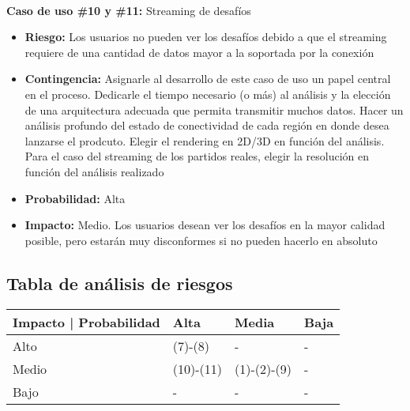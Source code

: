 ~

\textbf{Caso de uso \#10 y \#11:} Streaming de desafíos
\begin{itemize}
\item{\textbf{Riesgo:} Los usuarios no pueden ver los desafíos debido a que el streaming requiere de una cantidad de datos mayor a la soportada por la conexión}
\item{\textbf{Contingencia:} Asignarle al desarrollo de este caso de uso un papel central en el proceso. Dedicarle el tiempo necesario (o más) al análisis y la elección 
de una arquitectura adecuada que permita transmitir muchos datos. Hacer un análisis profundo del estado de conectividad de cada región en donde desea lanzarse el prodcuto.
Elegir el rendering en 2D/3D en función del análisis. Para el caso del streaming de los partidos reales, elegir la resolución en función del análisis realizado}
\item{\textbf{Probabilidad:} Alta}
\item{\textbf{Impacto:} Medio. Los usuarios desean ver los desafíos en la mayor calidad posible, pero estarán muy disconformes si no pueden hacerlo en absoluto}
\end{itemize}


\subsection{Tabla de análisis de riesgos}

\begin{center}
    \begin{tabular}{ | l | l | l | p{5cm} |}
    \hline
    Impacto | Probabilidad & Alta & Media & Baja \\ \hline
    Alto & (7)-(8) & - & - \\ \hline
    Medio & (10)-(11) & (1)-(2)-(9) & - \\ \hline
    Bajo & - & - & - \\ \hline
    \end{tabular}
\end{center}
